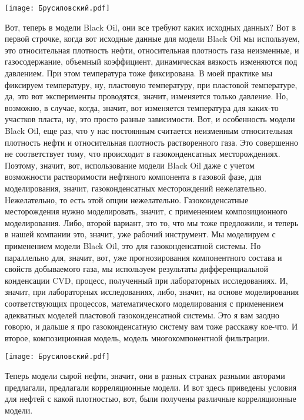 \documentclass[main.tex]{subfiles}
\begin{document}
\begin{center}
\texttt{[image: Брусиловский.pdf]}
\end{center}

Вот, теперь в модели Black Oil, они все требуют каких исходных данных?
Вот в первой строчке, когда вот исходные данные для модели Black Oil мы используем, это относительная плотность нефти, относительная плотность газа неизменные, и газосодержание, объемный коэффициент, динамическая вязкость изменяются под давлением.
При этом температура тоже фиксирована.
В моей практике мы фиксируем температуру, ну, пластовую температуру, при пластовой температуре, да, это вот эксперименты проводятся, значит, изменяется только давление.
Но, возможно, в случае, когда, значит, вот изменяется температура для каких-то участков пласта, ну, это просто разные зависимости.
Вот, и особенность модели Black Oil, еще раз, что у нас постоянным считается неизменным относительная плотность нефти и относительная плотность растворенного газа.
Это совершенно не соответствует тому, что происходит в газоконденсатных месторождениях.
Поэтому, значит, вот, использование модели Black Oil даже с учетом возможности растворимости нефтяного компонента в газовой фазе, для моделирования, значит, газоконденсатных месторождений нежелательно.
Нежелательно, то есть этой опции нежелательно.
Газоконденсатные месторождения нужно моделировать, значит, с применением композиционного моделирования.
Либо, второй вариант, это то, что мы тоже предложили, и теперь в нашей компании это, значит, уже рабочий инструмент.
Мы моделируем с применением модели Black Oil, это для газоконденсатной системы.
Но параллельно для, значит, вот, уже прогнозирования компонентного состава и свойств добываемого газа, мы используем результаты дифференциальной конденсации CVD, процесс, полученный при лабораторных исследованиях.
И, значит, при лабораторных исследованиях, либо, значит, на основе моделирования соответствующих процессов, математического моделирования с применением адекватных моделей пластовой газоконденсатной системы.
Это я вам заодно говорю, и дальше я про газоконденсатную систему вам тоже расскажу кое-что.
И второе, композиционная модель, модель многокомпонентной фильтрации.

\begin{center}
\texttt{[image: Брусиловский.pdf]}
\end{center}

Теперь модели сырой нефти, значит, они в разных странах разными авторами предлагали, предлагали корреляционные модели.
И вот здесь приведены условия для нефтей с какой плотностью, вот, были получены различные корреляционные модели.
\end{document}
